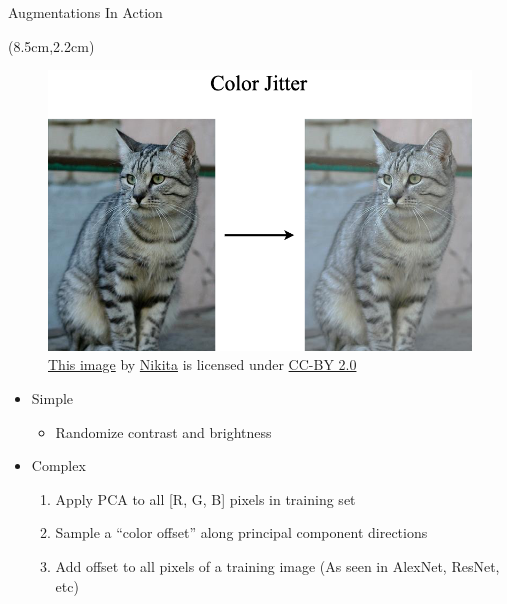 \documentclass[serif, aspectratio=169]{beamer}
\begin{document}
\begin{frame}{Augmentations In Action}
	\begin{textblock*}{7cm}(8.5cm,2.2cm) %
		\begin{figure}
			\includegraphics[keepaspectratio, scale=0.24]{pic/jitter}
			\caption*{\tiny{\href{https://www.flickr.com/photos/malfet/1428198050}{\color{blue} This image} by \href{https://www.flickr.com/photos/malfet/}{\color{blue} Nikita} is licensed under \href{https://creativecommons.org/licenses/by/2.0/}{\color{blue} CC-BY 2.0}}}
		\end{figure}

	\end{textblock*}
	
	\begin{itemize}
		\item Simple
		\begin{itemize}
			\item Randomize contrast and brightness
		\end{itemize}
		\item Complex
		\begin{enumerate}
			\item Apply PCA to all [R, G, B] pixels \newline in training set
			\item Sample a “color offset” along principal \newline component directions
			\item Add offset to all pixels of a training \newline image
			\newline \small{(As seen in AlexNet, ResNet, etc)}
		\end{enumerate}
	\end{itemize}
\end{frame}
\end{document}
